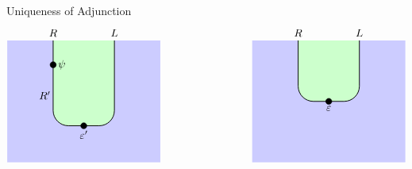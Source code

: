 \begin{proposition}{Uniqueness of Adjunction}{}
\[\begin{tikzpicture}
\begin{scope}[shift={(8,0)}]
           \end{scope}
           
           \begin{scope}[shift={(16,0)}]
               \begin{scope} 
                   \clip (-2.5,0) rectangle (2.5, 4);     
                   \fill[fill=midcolor] (-3,0) rectangle (3, 4);  
                    
                   \draw[fill=leftcolor, rounded corners=0.5cm, line width=0.7pt] (-1, 6) rectangle (1, 1.2);
               \end{scope}
             
               \filldraw [black] (-1,3.2) circle (0.1) node[right=1pt] {$\psi$};
               \node[above] at (-1, 4) {$R$};
               \node[left=-1pt] at (-1, 2.2) {$R'$};
               \node[above] at (1, 4) {$L$};
               \draw[fill=black] (0, 1.2) circle (0.1);
               \node[below=1pt] at (0, 1.2) {$\varepsilon'$}; 
             
           \end{scope}
           
           \begin{scope}[shift={(24,0)}]
               \begin{scope} 
                   \clip (-2.5,0) rectangle (2.5, 4); 
                   \fill[fill=midcolor] (-3,0) rectangle (3, 4);  
                   \draw[fill=leftcolor, rounded corners=0.5cm, line width=0.7pt] (-1, 6) rectangle (1, 2);
               \end{scope}
               \node[above] at (1, 4) {$L$};
               \node[above] at (-1, 4) {$R$};
               \draw[fill=black] (0, 2) circle (0.1);
               \node[below=1pt] at (0, 2) {$\varepsilon$}; 
           
           \end{scope}
           
        \end{tikzpicture}
    \]
\end{proposition}

